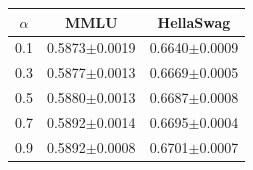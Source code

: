 \begin{tabular}{ccc}
\toprule
$\alpha$ & \textbf{MMLU} & \textbf{HellaSwag} \\
\midrule
0.1 & 0.5873$\pm$0.0019 & 0.6640$\pm$0.0009 \\
0.3 & 0.5877$\pm$0.0013 & 0.6669$\pm$0.0005 \\
0.5 & 0.5880$\pm$0.0013 & 0.6687$\pm$0.0008 \\
0.7 & 0.5892$\pm$0.0014 & 0.6695$\pm$0.0004 \\
0.9 & 0.5892$\pm$0.0008 & 0.6701$\pm$0.0007 \\
\bottomrule
\end{tabular}
